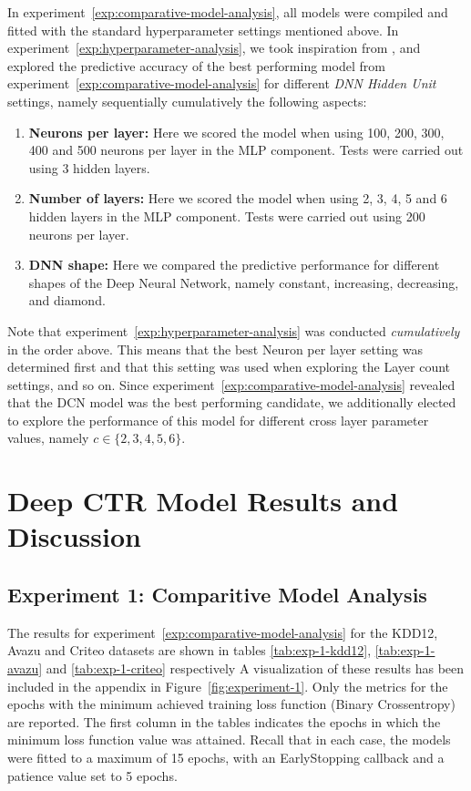 \documentclass{mldsmsc}
\begin{document}
In experiment~\ref{exp:comparative-model-analysis}, all models were compiled and fitted with the
standard hyperparameter settings mentioned above. In experiment~\ref{exp:hyperparameter-analysis},
we took inspiration from \citep{RefWorks:guo2017deepfm:}, and explored the predictive accuracy of the
best performing model from experiment~\ref{exp:comparative-model-analysis} for different
\emph{DNN Hidden Unit} settings, namely sequentially cumulatively the following aspects:

\begin{enumerate}
    \item \textbf{Neurons per layer:} Here we scored the model when using 100, 200, 300, 400
    and 500 neurons per layer in the MLP component. Tests were carried out using 3 hidden layers.
    \item \textbf{Number of layers:} Here we scored the model when using 2, 3, 4, 5 and 6 hidden layers in
    the MLP component. Tests were carried out using 200 neurons per layer.
    \item \textbf{DNN shape:} Here we compared the predictive performance for different
    shapes of the Deep Neural Network, namely constant, increasing, decreasing, and diamond.
\end{enumerate}

Note that experiment~\ref{exp:hyperparameter-analysis} was conducted \emph{cumulatively} in the
order above. This means that the best Neuron per layer setting was determined first and that
this setting was used when exploring the Layer count settings, and so on.
Since experiment~\ref{exp:comparative-model-analysis} revealed that the DCN model was the best performing
candidate, we additionally elected to explore the performance of this model for different cross layer parameter
values, namely $c \in \{2,3,4,5,6\}$.

\section{Deep CTR Model Results and Discussion}
\label{sec:model-results}

\subsection{Experiment 1: Comparitive Model Analysis}

The results for experiment~\ref{exp:comparative-model-analysis} for the KDD12, 
Avazu and Criteo datasets are shown
in tables \ref{tab:exp-1-kdd12}, \ref{tab:exp-1-avazu} and \ref{tab:exp-1-criteo} respectively
A visualization of these results has been included in the appendix in Figure~\ref{fig:experiment-1}. 
Only the
metrics for the epochs with the minimum achieved training loss function (Binary Crossentropy) are 
reported. The first column in the tables indicates the epochs in which the minimum loss function
value was attained. Recall that in each case, the models were fitted to a maximum of 15 epochs,
with an EarlyStopping callback and a patience value set to 5 epochs.
\end{document}
